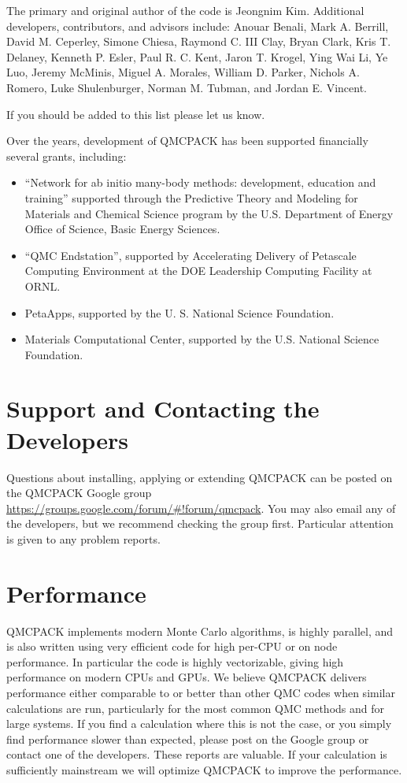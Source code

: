 The primary and original author of the code is Jeongnim
Kim. Additional developers, contributors, and advisors include:
Anouar Benali,
Mark A. Berrill,  
David M. Ceperley, 
Simone Chiesa,
Raymond C. III Clay,
Bryan Clark,
Kris T. Delaney,
Kenneth P. Esler,
Paul R. C. Kent,
Jaron T. Krogel,
Ying Wai Li,
Ye Luo,
Jeremy McMinis,
Miguel A. Morales,
William D. Parker,
Nichols A. Romero,
Luke Shulenburger,
Norman M. Tubman,
and Jordan E. Vincent.

If you should be added to this list please let us know.

Over the years, development of QMCPACK has been supported financially
several grants, including:

\begin{itemize}
\item ``Network for ab initio many-body methods: development, education
  and training'' supported through the Predictive
  Theory and Modeling for Materials and Chemical Science program by
  the U.S. Department of Energy Office of Science, Basic Energy
  Sciences.
\item ``QMC Endstation'', supported by Accelerating Delivery of Petascale
  Computing Environment at the DOE Leadership Computing Facility at
  ORNL.
\item PetaApps, supported by the U. S. National Science
  Foundation.
\item Materials Computational Center, supported by the
  U.S. National Science Foundation.
\end{itemize}


\section{Support and Contacting the Developers}
\label{sec:support}

Questions about installing, applying or extending QMCPACK can be
posted on the QMCPACK Google group
\url{https://groups.google.com/forum/#!forum/qmcpack}. You may also
email any of the developers, but we recommend checking the group
first. Particular attention is given to any problem reports.

\section{Performance}
\label{sec:performance}

QMCPACK implements modern Monte Carlo algorithms, is highly parallel,
and is also written using very efficient code for high per-CPU or on
node performance. In particular the code is highly vectorizable,
giving high performance on modern CPUs and GPUs. We believe QMCPACK
delivers performance either comparable to or better than other QMC
codes when similar calculations are run, particularly for the most
common QMC methods and for large systems. If you find a calculation where this is not the
case, or you simply find performance slower than expected, please post on the Google
group or contact one of the developers. These reports are valuable. If your calculation is
sufficiently mainstream we will optimize QMCPACK to improve
the performance.

